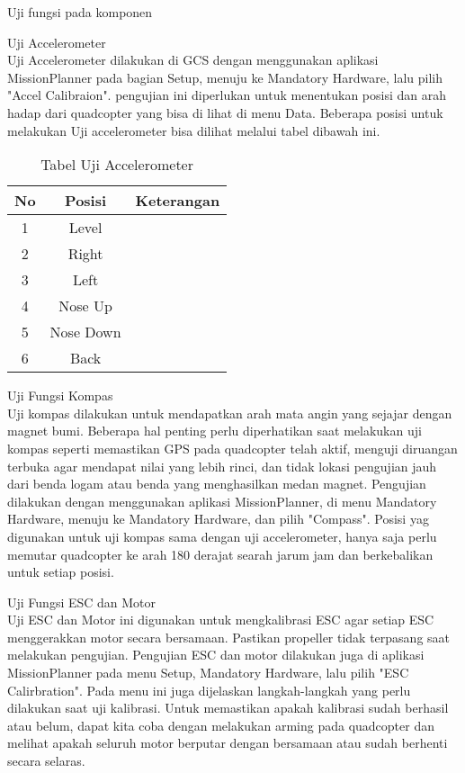 \begin{packed_item}
	\item Uji fungsi pada komponen
	\begin{packed_item}
		\item [a.] Uji Accelerometer
		\\ Uji Accelerometer dilakukan di GCS dengan menggunakan aplikasi MissionPlanner pada bagian Setup, menuju ke Mandatory Hardware, lalu pilih "Accel Calibraion". pengujian ini diperlukan untuk menentukan posisi dan arah hadap dari quadcopter yang bisa di lihat di menu Data. Beberapa posisi untuk melakukan Uji accelerometer bisa dilihat melalui tabel dibawah ini.
		\begin{table}[h]
			\label{tab:accel}
			\centering
			\begin{tabular}{|c|c|c|}
				\hline
				No & Posisi    & Keterangan \\ \hline
				1  & Level     &            \\ \hline
				2  & Right     &            \\ \hline
				3  & Left      &            \\ \hline
				4  & Nose Up   &            \\ \hline
				5  & Nose Down &            \\ \hline
				6  & Back      &            \\ \hline
			\end{tabular}
			\caption{Tabel Uji Accelerometer}
		\end{table}
		
		\item [b.] Uji Fungsi Kompas
		\\ Uji kompas dilakukan untuk mendapatkan arah mata angin yang sejajar dengan magnet bumi. Beberapa hal penting perlu diperhatikan saat melakukan uji kompas seperti memastikan GPS pada quadcopter telah aktif, menguji diruangan terbuka agar mendapat nilai yang lebih rinci, dan tidak lokasi pengujian jauh dari benda logam atau benda yang menghasilkan medan magnet.
		Pengujian dilakukan dengan menggunakan aplikasi MissionPlanner, di menu Mandatory Hardware, menuju ke Mandatory Hardware, dan pilih "Compass". Posisi yag digunakan untuk uji kompas sama dengan uji accelerometer, hanya saja perlu memutar quadcopter ke arah 180 derajat searah jarum jam dan berkebalikan untuk setiap posisi.
		
		\item [c.] Uji Fungsi ESC dan Motor
		\\ Uji ESC dan Motor ini digunakan untuk mengkalibrasi ESC agar setiap ESC menggerakkan motor secara bersamaan. Pastikan propeller tidak terpasang saat melakukan pengujian. 
		Pengujian ESC dan motor dilakukan juga di aplikasi MissionPlanner pada menu Setup, Mandatory Hardware, lalu pilih "ESC Calirbration". Pada menu ini juga dijelaskan langkah-langkah yang perlu dilakukan saat uji kalibrasi.
		Untuk memastikan apakah kalibrasi sudah berhasil atau belum, dapat kita coba dengan melakukan arming pada quadcopter dan melihat apakah seluruh motor berputar dengan bersamaan atau sudah berhenti secara selaras.
		

\end{packed_item}
\end{packed_item}
